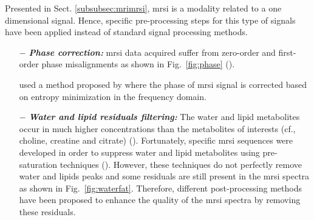 Presented in Sect. \ref{subsubsec:mrimrsi}, \ac{mrsi} is a modality related to a one dimensional signal. Hence, specific pre-processing steps for this type of signals have been applied instead of standard signal processing methods.

\begin{enumerate}[leftmargin=*]

	\item[$-$] \textbf{\textit{Phase correction:}} \ac{mrsi} data acquired suffer from zero-order and first-order phase misalignments as shown in Fig.~\ref{fig:phase} (\cite{Chen2002,Osorio-Garcia2012}). 
	
\cite{Parfait2012} used a method proposed by \cite{Chen2002} where the phase of \ac{mrsi} signal is corrected based on entropy minimization in the frequency domain.%
%
%
%
%
%
%

	\item[$-$] \textbf{\textit{Water and lipid residuals filtering:}} The water and lipid metabolites occur in much higher concentrations than the metabolites of interests (cf., choline, creatine and citrate) (\cite{Zhu2010,Osorio-Garcia2012}). Fortunately, specific \ac{mrsi} sequences were developed in order to suppress water and lipid metabolites using pre-saturation techniques (\cite{Zhu2010}). However, these techniques do not perfectly remove water and lipids peaks and some residuals are still present in the \ac{mrsi} spectra as shown in Fig.~\ref{fig:waterfat}. Therefore, different post-processing methods have been proposed to enhance the quality of the \ac{mrsi} spectra by removing these residuals.
	

\end{enumerate}
